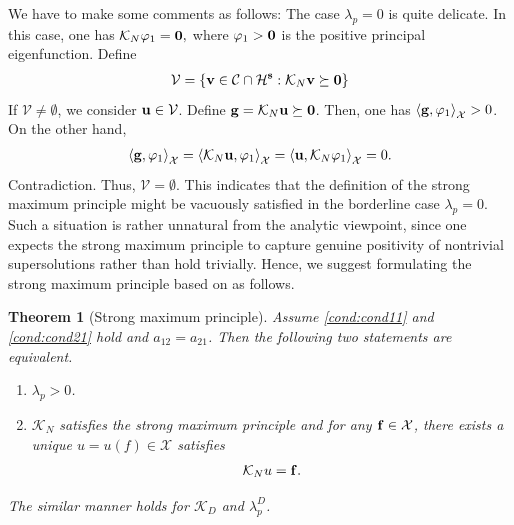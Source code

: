 \documentclass[a4paper,11pt]{amsart}
\newtheorem{theorem}{Theorem}
\theoremstyle{definition}
\numberwithin{equation}{section}
\theoremstyle{definition}
\begin{document}
We have to make some comments as follows: The case $\lambda_p=0$ is quite delicate. In this case, one has $\mathcal{K}_N\varphi_1={\bf 0},$ where $\varphi_1>{\bf 0}$ is the positive principal eigenfunction. Define
\begin{align*} 
\mathcal{V}=\{{\bf v}\in \mathcal{C}\cap \mathcal{H}^{\bf s}:\mathcal{K}_N{\bf v}\succeq {\bf 0}\}
\end{align*}
If $\mathcal{V}\neq \emptyset$, we consider ${\bf u}\in \mathcal{V}$. Define ${\bf g}=\mathcal{K}_N{\bf u}\succeq {\bf 0}$. Then, one has $\left<{\bf g},\varphi_1\right>_{\mathcal{X}}>0$. On the other hand, 
\begin{align*}
\left<{\bf g},\varphi_1\right>_{\mathcal{X}}=\left<\mathcal{K}_N{\bf u},\varphi_1\right>_{\mathcal{X}}=\left<{\bf u},\mathcal{K}_N\varphi_1\right>_{\mathcal{X}}=0.
\end{align*}
Contradiction. Thus, $\mathcal{V}=\emptyset$. This indicates that the definition of the strong maximum principle might be vacuously satisfied in the borderline case $\lambda_p=0$. Such a situation is rather unnatural from the analytic viewpoint, since one expects the strong maximum principle to capture genuine positivity of nontrivial supersolutions rather than hold trivially. Hence, we suggest formulating the strong maximum principle based on \cite[Proposition A.7]{zhao_spatiotemporal_2025} as follows.

\begin{theorem}[Strong maximum principle]
Assume \ref{cond:cond11} and \ref{cond:cond21} hold and $a_{12}=a_{21}$. Then the following two statements are equivalent.
\begin{enumerate}[label=(\roman*)]
\item\label{SMP} $\lambda_p > 0$.

\item\label{SMP1} $\mathcal{K}_N$ satisfies the {\it strong maximum principle} and for any ${\bf f}\in \mathcal{X}$, there exists a unique $u=u(f)\in  \mathcal{X}$ satisfies
\begin{align*}
\mathcal{K}_N u = {\bf f}.
\end{align*}


\end{enumerate}
The similar manner holds for $\mathcal{K}_D$ and $\lambda^D_p$.


\end{theorem}
\end{document}
